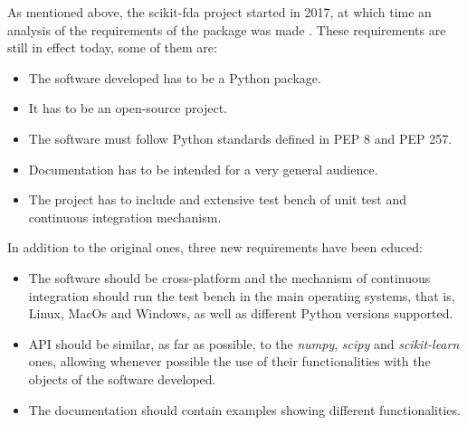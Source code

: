 
As mentioned above, the scikit-fda project started in 2017, at which time an
analysis of the requirements of the package was made \cite{FDA2018}. These
requirements are still in effect today, some of them are:

\begin{itemize}
\item The software developed has to be a Python package.
\item It has to be an open-source project.
\item The software must follow Python standards defined in PEP 8 and PEP 257.
\item Documentation has to be intended for a very general audience.
\item The project has to include and extensive test bench of unit test and continuous integration mechanism.
\end{itemize}
In addition to the original ones, three new requirements have been educed:

\begin{itemize}
\item The software should be cross-platform and the mechanism of
 continuous integration should run the test bench in the main operating systems, that is, 
 Linux, MacOs and Windows, as well as different Python versions supported.
 
\item  API should be similar, as far as possible, to the \textit{numpy}\cite{numpy}, \textit{scipy}\cite{scipy} and
 \textit{scikit-learn}\cite{sklearn} ones, allowing whenever possible the use of their functionalities with the
  objects of the software developed.
\item The documentation should contain examples showing different functionalities.
\end{itemize}
